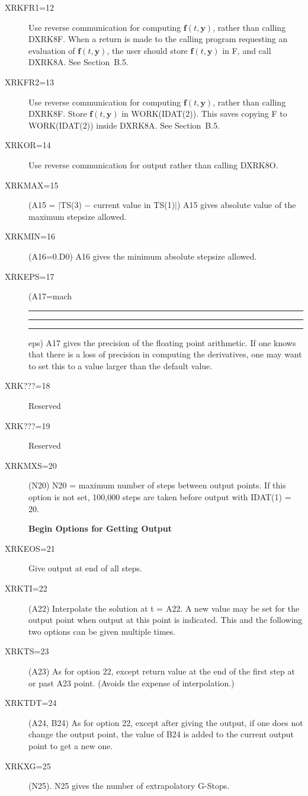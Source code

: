 \documentclass[twoside]{MATH77}
\DeclareRobustCommand{\us}{\rule{.2pt}{0pt}\rule[-.8pt]{.4em}{.5pt}\rule{.7pt}{0pt}}
\begin{document}
\begin{description}
\item[XRKFR1=12] Use reverse communication for computing ${\mathbf
f}(t,{\mathbf y})$, rather than calling DXRK8F.  When a return is made to
the calling program requesting an evaluation of ${\mathbf f}(t,{\mathbf
y})$, the user should store ${\mathbf f}(t,{\mathbf y})$ in F, and call
DXRK8A.  See Section~B.5.
\item[XRKFR2=13] Use reverse communication for computing $\mathbf
{f}(t,\mathbf{y})$, rather than calling DXRK8F.  Store ${\mathbf
f}(t,\mathbf{y})$ in WORK(IDAT(2)).  This saves copying F to
WORK(IDAT(2)) inside DXRK8A.  See Section~B.5.
\item[XRKOR=14] Use reverse communication for output rather than calling
DXRK8O.
\item[XRKMAX=15] (A15 = $|$TS(3) $-$ current value in TS(1)$|$) A15 gives
absolute value of the maximum stepsize allowed.
\item[XRKMIN=16] (A16=0.D0) A16 gives the minimum absolute stepsize allowed.
\item[XRKEPS=17] (A17=mach\us eps) A17 gives the precision of the floating
point arithmetic.  If one knows that there is a loss of precision in
computing the derivatives, one may want to set this to a value larger than
the default value.
\item[XRK???=18] Reserved
\item[XRK???=19] Reserved
\item[XRKMXS=20] (N20) N20 = maximum number of steps between output points.
   If this option is not set, 100,000 steps are taken before output
   with IDAT(1) = 20.
\item[ ] {\bf \hspace{-10pt} Begin Options for Getting Output}
\item[XRKEOS=21] Give output at end of all steps.
\item[XRKTI=22] (A22) Interpolate the solution at t = A22.  A new
  value may be set for the output point when output at this point is
  indicated.  This and the following two options can be given multiple
  times.
\item[XRKTS=23] (A23) As for option 22, except return value at the end of
   the first step at or past A23 point.  (Avoids the expense of
   interpolation.)
\item[XRKTDT=24] (A24, B24) As for option 22, except after giving the output,
   if one does not change the output point, the value of B24 is added
   to the current output point to get a new one.
\item[XRKXG=25] (N25).  N25 gives the number of extrapolatory G-Stops.

\end{description}
\end{document}
